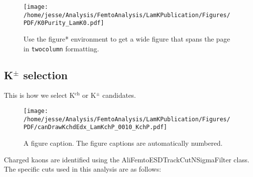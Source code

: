 \documentclass[ALICE,manyauthors]{cernphprep}
\begin{document}
\begin{figure*}
\texttt{[image: /home/jesse/Analysis/FemtoAnalysis/LamKPublication/Figures/PDF/K0Purity\_LamK0.pdf]}%
\caption{\label{fig:wide}Use the figure* environment to get a wide
figure that spans the page in \texttt{twocolumn} formatting.}
\end{figure*}

\subsection{K$^{\pm}$ selection}
\label{sec:KchSelection}
This is how we select K$^{\mathrm{ch}}$ or K$^{\pm}$ candidates.

\begin{figure}[b]
\texttt{[image: /home/jesse/Analysis/FemtoAnalysis/LamKPublication/Figures/PDF/canDrawKchdEdx\_LamKchP\_0010\_KchP.pdf]}%
\caption{\label{fig:epsart} A figure caption. The figure captions are
automatically numbered.}
\end{figure}

Charged kaons are identified using the AliFemtoESDTrackCutNSigmaFilter class.  The specific cuts used in this analysis are as follows:
\end{document}
